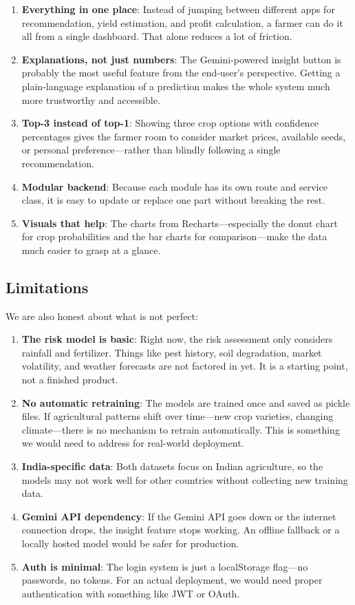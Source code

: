 \documentclass[conference]{IEEEtran}
\begin{document}
\begin{enumerate}
    \item \textbf{Everything in one place}: Instead of jumping between different apps for recommendation, yield estimation, and profit calculation, a farmer can do it all from a single dashboard. That alone reduces a lot of friction.
    \item \textbf{Explanations, not just numbers}: The Gemini-powered insight button is probably the most useful feature from the end-user's perspective. Getting a plain-language explanation of a prediction makes the whole system much more trustworthy and accessible.
    \item \textbf{Top-3 instead of top-1}: Showing three crop options with confidence percentages gives the farmer room to consider market prices, available seeds, or personal preference---rather than blindly following a single recommendation.
    \item \textbf{Modular backend}: Because each module has its own route and service class, it is easy to update or replace one part without breaking the rest.
    \item \textbf{Visuals that help}: The charts from Recharts---especially the donut chart for crop probabilities and the bar charts for comparison---make the data much easier to grasp at a glance.
\end{enumerate}

\subsection{Limitations}
We are also honest about what is not perfect:

\begin{enumerate}
    \item \textbf{The risk model is basic}: Right now, the risk assessment only considers rainfall and fertilizer. Things like pest history, soil degradation, market volatility, and weather forecasts are not factored in yet. It is a starting point, not a finished product.
    \item \textbf{No automatic retraining}: The models are trained once and saved as pickle files. If agricultural patterns shift over time---new crop varieties, changing climate---there is no mechanism to retrain automatically. This is something we would need to address for real-world deployment.
    \item \textbf{India-specific data}: Both datasets focus on Indian agriculture, so the models may not work well for other countries without collecting new training data.
    \item \textbf{Gemini API dependency}: If the Gemini API goes down or the internet connection drops, the insight feature stops working. An offline fallback or a locally hosted model would be safer for production.
    \item \textbf{Auth is minimal}: The login system is just a localStorage flag---no passwords, no tokens. For an actual deployment, we would need proper authentication with something like JWT or OAuth.
\end{enumerate}
\end{document}
